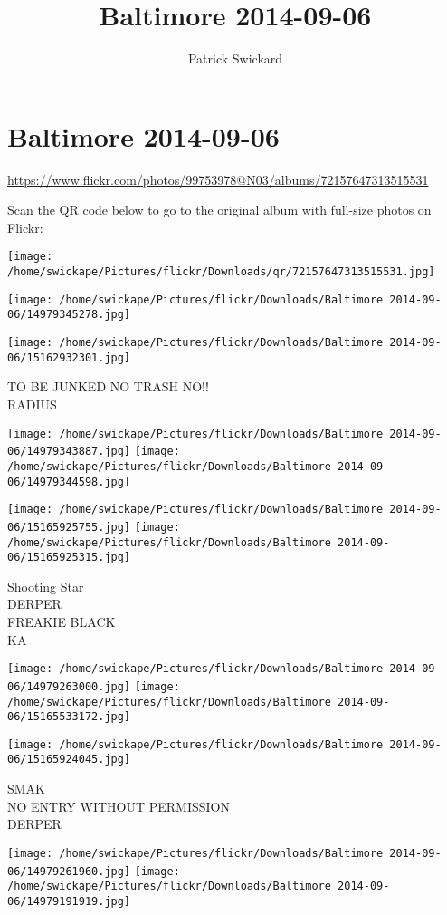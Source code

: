\documentclass[10pt,letterpaper]{article}
\title{Baltimore 2014-09-06}
\author{Patrick Swickard}
\date{}
\begin{document}
\section*{Baltimore 2014-09-06}

\url{https://www.flickr.com/photos/99753978@N03/albums/72157647313515531}

Scan the QR code below to go to the original album with full-size photos on Flickr:

\texttt{[image: /home/swickape/Pictures/flickr/Downloads/qr/72157647313515531.jpg]}
\pagebreak

\texttt{[image: /home/swickape/Pictures/flickr/Downloads/Baltimore 2014-09-06/14979345278.jpg]}

\vspace{0.25in}
\texttt{[image: /home/swickape/Pictures/flickr/Downloads/Baltimore 2014-09-06/15162932301.jpg]}

TO BE JUNKED NO TRASH NO!!\\
RADIUS
\pagebreak

\texttt{[image: /home/swickape/Pictures/flickr/Downloads/Baltimore 2014-09-06/14979343887.jpg]}
\texttt{[image: /home/swickape/Pictures/flickr/Downloads/Baltimore 2014-09-06/14979344598.jpg]}

\texttt{[image: /home/swickape/Pictures/flickr/Downloads/Baltimore 2014-09-06/15165925755.jpg]}
\texttt{[image: /home/swickape/Pictures/flickr/Downloads/Baltimore 2014-09-06/15165925315.jpg]}

Shooting Star\\
DERPER\\
FREAKIE BLACK\\
KA
\pagebreak

\texttt{[image: /home/swickape/Pictures/flickr/Downloads/Baltimore 2014-09-06/14979263000.jpg]}
\texttt{[image: /home/swickape/Pictures/flickr/Downloads/Baltimore 2014-09-06/15165533172.jpg]}

\vspace{0.25in}
\texttt{[image: /home/swickape/Pictures/flickr/Downloads/Baltimore 2014-09-06/15165924045.jpg]}

SMAK\\
NO ENTRY WITHOUT PERMISSION\\
DERPER
\pagebreak

\texttt{[image: /home/swickape/Pictures/flickr/Downloads/Baltimore 2014-09-06/14979261960.jpg]}
\texttt{[image: /home/swickape/Pictures/flickr/Downloads/Baltimore 2014-09-06/14979191919.jpg]}
\end{document}
